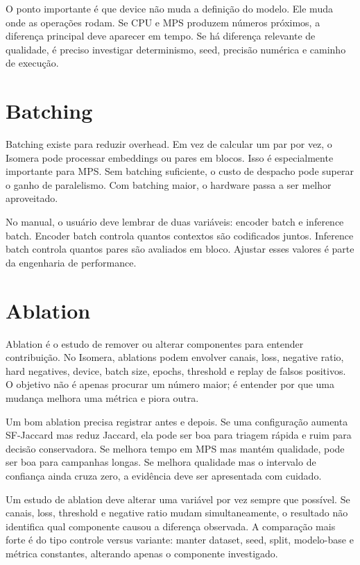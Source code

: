 \documentclass[12pt,oneside]{book}
\begin{document}
O ponto importante é que device não muda a definição do modelo. Ele muda onde as operações rodam. Se CPU e MPS produzem números próximos, a diferença principal deve aparecer em tempo. Se há diferença relevante de qualidade, é preciso investigar determinismo, seed, precisão numérica e caminho de execução.

\section{Batching}

Batching existe para reduzir overhead. Em vez de calcular um par por vez, o Isomera pode processar embeddings ou pares em blocos. Isso é especialmente importante para MPS. Sem batching suficiente, o custo de despacho pode superar o ganho de paralelismo. Com batching maior, o hardware passa a ser melhor aproveitado.

No manual, o usuário deve lembrar de duas variáveis: encoder batch e inference batch. Encoder batch controla quantos contextos são codificados juntos. Inference batch controla quantos pares são avaliados em bloco. Ajustar esses valores é parte da engenharia de performance.

\section{Ablation}

Ablation é o estudo de remover ou alterar componentes para entender contribuição. No Isomera, ablations podem envolver canais, loss, negative ratio, hard negatives, device, batch size, epochs, threshold e replay de falsos positivos. O objetivo não é apenas procurar um número maior; é entender por que uma mudança melhora uma métrica e piora outra.

Um bom ablation precisa registrar antes e depois. Se uma configuração aumenta SF-Jaccard mas reduz Jaccard, ela pode ser boa para triagem rápida e ruim para decisão conservadora. Se melhora tempo em MPS mas mantém qualidade, pode ser boa para campanhas longas. Se melhora qualidade mas o intervalo de confiança ainda cruza zero, a evidência deve ser apresentada com cuidado.

Um estudo de ablation deve alterar uma variável por vez sempre que possível. Se canais, loss, threshold e negative ratio mudam simultaneamente, o resultado não identifica qual componente causou a diferença observada. A comparação mais forte é do tipo controle versus variante: manter dataset, seed, split, modelo-base e métrica constantes, alterando apenas o componente investigado.
\end{document}
